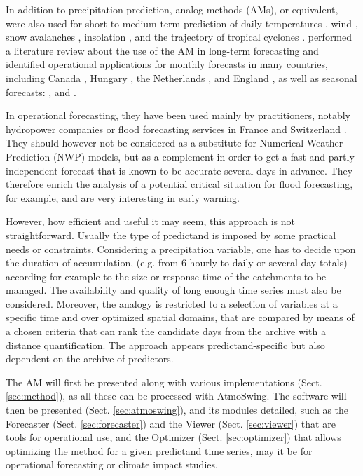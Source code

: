 \documentclass[review]{elsarticle}
\begin{document}
In addition to precipitation prediction, analog methods (AMs), or equivalent, were also used for short to medium term prediction of daily temperatures \citep{Radinovic1975, Woodcock1980, Kruizinga1983}, wind \citep{Gordon1987}, snow avalanches \citep{Obled1980, Bolognesi1993}, insolation \citep{Bois1981}, and the trajectory of tropical cyclones \citep{Keenan1981, Sievers2000, Fraedrich2003}. \citet{Guilbaud1997} performed a literature review about the use of the AM in long-term forecasting and identified operational applications for monthly forecasts in many countries, including Canada \citep{Shabbar1986},  Hungary \citep{Toth1989}, the Netherlands \citep{Nap1981}, and England \citep{Murray1974}, as well as seasonal forecasts: \citet{Barnett1978}, \citet{Bergen1982} and \citet{Livezey1988}.

In operational forecasting, they have been used mainly by practitioners, notably hydropower companies \citep{Desaint2008a,BenDaoud2009,Obled2014} or flood forecasting services in France and Switzerland \citep{Marty2010,GarciaHernandez2009b,Horton2012}. They should however not be considered as a substitute for Numerical Weather Prediction (NWP) models, but as a complement in order to get a fast and partly independent forecast that is known to be accurate several days in advance. They therefore enrich the analysis of a potential critical situation for flood forecasting, for example, and are very interesting in early warning.

However, how efficient and useful it may seem, this approach is not straightforward. Usually the type of predictand is imposed by some practical needs or constraints. Considering a precipitation variable, one has to decide upon the duration of accumulation, (e.g. from 6-hourly to daily or several day totals) according for example to the size or response time of the catchments to be managed. The availability and quality of long enough time series must also be considered. Moreover, the analogy is restricted to a selection of variables at a specific time and over optimized spatial domains, that are compared by means of a chosen criteria that can rank the candidate days from the archive with a distance quantification. The approach appears predictand-specific but also dependent on the archive of predictors. 

The AM will first be presented along with various implementations (Sect. \ref{sec:method}), as all these can be processed with AtmoSwing. The software will then be presented (Sect. \ref{sec:atmoswing}), and its modules detailed, such as the Forecaster (Sect. \ref{sec:forecaster}) and the Viewer (Sect. \ref{sec:viewer}) that are tools for operational use, and the Optimizer (Sect. \ref{sec:optimizer}) that allows optimizing the method for a given predictand time series, may it be for operational forecasting or climate impact studies.
\end{document}
